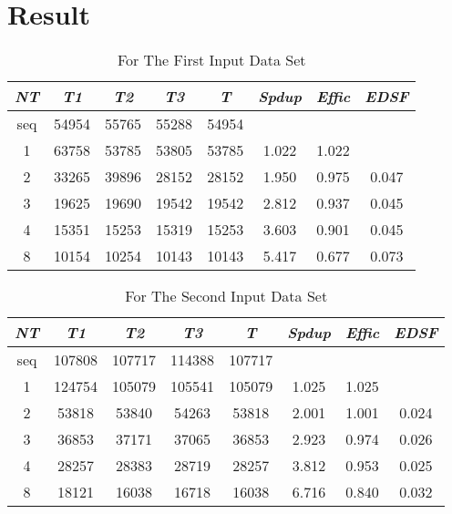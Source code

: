 \documentclass[12pt]{article}
\begin{document}
\section{Result}

\begin{table}[htb]
\begin{center}
\begin{normalsize}
\caption{For The First Input Data Set}
\begin {tabular} {|c|c|c|c|c|c|c|c|}
\hline 
\hline
{\em \bf NT} & {\em \bf T1} &{\em \bf T2}&{\em \bf T3}&{\em \bf T}&{\em \bf Spdup}&{\em \bf Effic}&{\em \bf EDSF}\\
\hline
seq&54954&55765&55288&54954&~&~&~\\
\hline
1&63758&53785&53805& 53785&1.022&1.022&~\\
\hline
2&33265&39896&28152&28152&1.950&0.975&0.047\\
\hline
3&19625&19690&19542&19542&2.812&0.937&0.045\\
\hline
4&15351&15253&15319&15253&3.603&0.901&0.045\\
\hline
8&10154&10254&10143&10143&5.417&0.677&0.073\\
\hline
\end {tabular}
\end{normalsize}
\end{center}
\end {table}



\begin{table}[htb]
\begin{center}
\begin{normalsize}
\caption{For The Second Input Data Set}
\begin {tabular} {|c|c|c|c|c|c|c|c|}
\hline 
\hline
{\em \bf NT} & {\em \bf T1} &{\em \bf T2}&{\em \bf T3}&{\em \bf T}&{\em \bf Spdup}&{\em \bf Effic}&{\em \bf EDSF}\\
\hline
seq&107808&107717&114388&107717&~&~&~\\
\hline
1&124754&105079&105541&105079&1.025&1.025&~\\
\hline
2&53818&53840&54263&53818&2.001&1.001&0.024\\
\hline
3&36853&37171&37065&36853&2.923&0.974&0.026\\
\hline
4&28257&28383&28719&28257&3.812&0.953&0.025\\
\hline
8&18121&16038&16718&16038&6.716&0.840&0.032\\
\hline
\end {tabular}
\end{normalsize}
\end{center}
\end {table}
\end{document}
